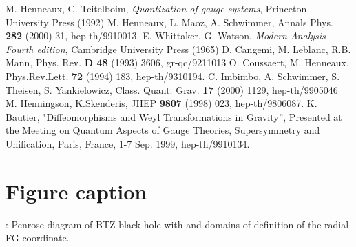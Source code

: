 \documentclass[a4paper,10pt]{article}
\begin{document}
\begin{thebibliography}{999}
 M. Henneaux, C. Teitelboim, {\it Quantization of gauge systems},
Princeton University Press (1992)
 M. Henneaux, L. Maoz, A. Schwimmer, Annals Phys. {\bf 282} 
   (2000) 31, hep-th/9910013.
E. Whittaker, G. Watson, {\it Modern Analysis-Fourth
    edition}, Cambridge University Press (1965)
D. Cangemi, M. Leblanc, R.B. Mann, Phys. Rev. {\bf D 48} (1993)
 3606, gr-qc/9211013
 O. Coussaert, M. Henneaux, Phys.Rev.Lett. {\bf 72} (1994) 183,
hep-th/9310194.
C. Imbimbo, A. Schwimmer, S. Theisen, S. Yankielowicz,
  Class. Quant. Grav. {\bf 17} (2000) 1129, hep-th/9905046
 M. Henningson, K.Skenderis, 
JHEP {\bf 9807} (1998) 023, hep-th/9806087.
 K. Bautier, "Diffeomorphisms and Weyl Transformations in \coordHE{}
Gravity'', Presented at the Meeting on Quantum Aspects of Gauge Theories,
Supersymmetry and Unification, Paris, France, 1-7 Sep. 1999, hep-th/9910134. 
\end{thebibliography}

\section{Figure caption}
: Penrose diagram of BTZ black hole with \coordHE{}  and domains of
definition of the radial FG coordinate.
\end{document}
